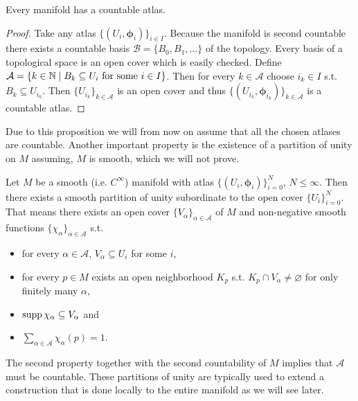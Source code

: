 \documentclass[../master_thesis.tex]{subfiles}
\begin{document}
\begin{proposition}
    Every manifold has a countable atlas. 
\end{proposition}
\begin{proof}
    Take any atlas $\{(U_i, \boldsymbol{\phi}_i) \}_{i \in I}$. Because the manifold is 
    second countable there exists a countable basis
    $\mathcal{B} = \{ B_0, B_1, ... \}$ of the topology. Every basis of a topological space is 
    an open cover which is easily checked. Define 
    $\mathcal{A} = \{ k \in \mathbb{N} \mid B_k \subseteq U_i \text{ for some 
    $i \in I$} \}$. Then for every $k \in \mathcal{A}$ choose 
    $i_k \in I$ s.t. $B_k \subseteq U_{i_k}$. Then $\{U_{i_k}\}_{k\in \mathcal{A}}$ 
    is an open cover and thus $\{ (U_{i_k}, \boldsymbol{\phi}_{i_k}) \}_{k \in \mathcal{A}}$
    is a countable atlas.
\end{proof}
Due to this proposition we will from now on assume that all the chosen atlases
are countable.
Another important property is the existence of a partition of unity on $M$ 
assuming, $M$ is smooth, which we will not prove.

\begin{theorem}\label{thm:partition_of_unity}
    Let $M$ be a smooth (i.e. $C^\infty$) manifold with atlas 
    $\{(U_i, \boldsymbol{\phi}_i)\}_{i=0}^N$, $N \leq \infty$. Then there exists a smooth
    partition of unity subordinate to the open cover $\{U_i\}_{i=0}^N$.
    That means there exists an open cover $\{ V_\alpha \}_{\alpha \in \mathcal{A}}$ of $M$ and
    non-negative smooth functions $\{ \chi_\alpha \}_{\alpha \in \mathcal{A}}$
    s.t. 
    \begin{itemize}
        \item for every $\alpha \in \mathcal{A}$, $V_\alpha \subseteq U_i$ for some $i$,
        \item for every $p \in M$ exists an open neighborhood $K_p$ s.t. 
                $K_p \cap V_\alpha \neq \varnothing$ for only finitely many $\alpha$,
        \item $\operatorname{supp} \chi_\alpha \subseteq V_\alpha$ and
        \item $\sum_{\alpha \in \mathcal{A}} \chi_\alpha(p) = 1$.
    \end{itemize}
\end{theorem}
The second property together with the second countability of $M$ implies that 
$\mathcal{A}$ must be countable.
These partitions of unity are typically used to extend a construction that 
is done locally to the entire manifold as we will see later.
\end{document}
